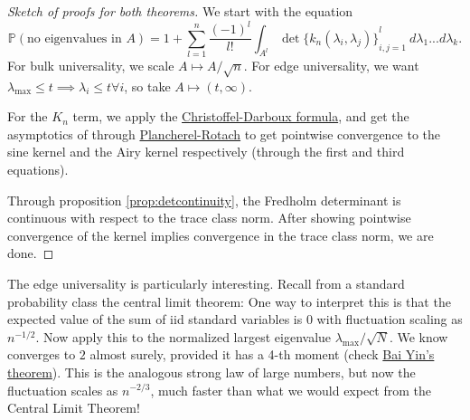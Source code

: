 \begin{proof}[Sketch of proofs for both theorems]
    We start with the equation 
    \[\mathbb{P}(\text{no eigenvalues in }A) =
    1+\sum_{l=1}^{n}\frac{(-1)^l}{l!} \int_{A^l}
    \det {\{k_n (\lambda_i,\lambda_j )\}}_{i,j=1}^{l} \ d\lambda_1...d\lambda_k.
    \]
    For bulk universality, we scale $A\mapsto A/\sqrt{n}$. For edge universality, we want $\lambda_{\max}\leq t \implies \lambda_i \leq t \forall i$, so take $A \mapsto (t,\infty)$.
    
    For the $K_n$ term, we apply the \hyperref[prop:hermiteproperties]{Christoffel-Darboux formula}, and get the asymptotics of through \hyperref[thm:placherelrotach]{Plancherel-Rotach} to get pointwise convergence to the sine kernel and the Airy kernel respectively (through the first and third equations).

    Through proposition \ref{prop:detcontinuity}, the Fredholm determinant is continuous with respect to the trace class norm. After showing pointwise convergence of the kernel implies convergence in the trace class norm, we are done.
    
\end{proof}
The edge universality is particularly interesting. Recall from a standard probability class the central limit theorem: 
One way to interpret this is that the expected value of the sum of iid standard variables is $0$ with fluctuation scaling as $n^{-1/2}$. Now apply this to the normalized largest eigenvalue $\lambda_{\max}/\sqrt{N}$. We know converges to $2$ almost surely, provided it has a 4-th moment (check \hyperref[thm:baiyin]{Bai Yin's theorem}). This is the analogous strong law of large numbers, but now the fluctuation scales as $n^{-2/3}$, much faster than what we would expect from the Central Limit Theorem!

